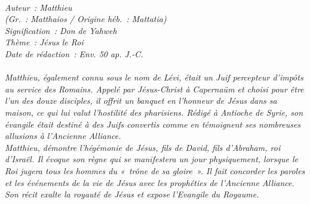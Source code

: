 \BFont
\noindent\hrulefill
{\footnotesize
\textit{
\bigskip
{\centering{}
\\Auteur~: Matthieu
\\(Gr.~: Matthaios / Origine héb.~: Mattatia)
\\Signification~: Don de Yahweh
\\Thème~: Jésus le Roi
\\Date de rédaction~: Env. 50 ap. J.-C.\\}
}
\textit{
\\Matthieu, également connu sous le nom de Lévi, était un Juif percepteur d'impôts au service des Romains. Appelé par Jésus-Christ à Capernaüm et choisi pour être l'un des douze disciples, il offrit un banquet en l'honneur de Jésus dans sa maison, ce qui lui valut l'hostilité des pharisiens. Rédigé à Antioche de Syrie, son évangile était destiné à des Juifs convertis comme en témoignent ses nombreuses allusions à l'Ancienne Alliance.
\\Matthieu, démontre l'hégémonie de Jésus, fils de David, fils d'Abraham, roi d'Israël. Il évoque son règne qui se manifestera un jour physiquement, lorsque le Roi jugera tous les hommes du «~trône de sa gloire~». Il fait concorder les paroles et les événements de la vie de Jésus avec les prophéties de l'Ancienne Alliance.
\\Son récit exalte la royauté de Jésus et expose l'Evangile du Royaume.\bigskip
}
}
\par\nobreak\noindent\hrulefill
